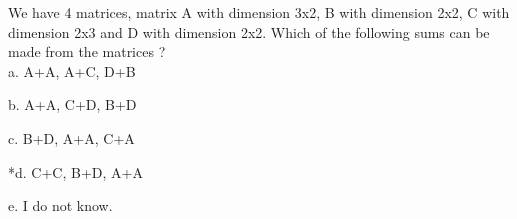 
We have 4 matrices, matrix A with dimension 3x2, B with dimension
2x2, C with dimension 2x3 and D with dimension 2x2. Which of the
following sums can be made from the matrices ?\\

a. A+A, A+C, D+B

b. A+A, C+D, B+D

c. B+D, A+A, C+A

*d. C+C, B+D, A+A

e. I do not know.\\

